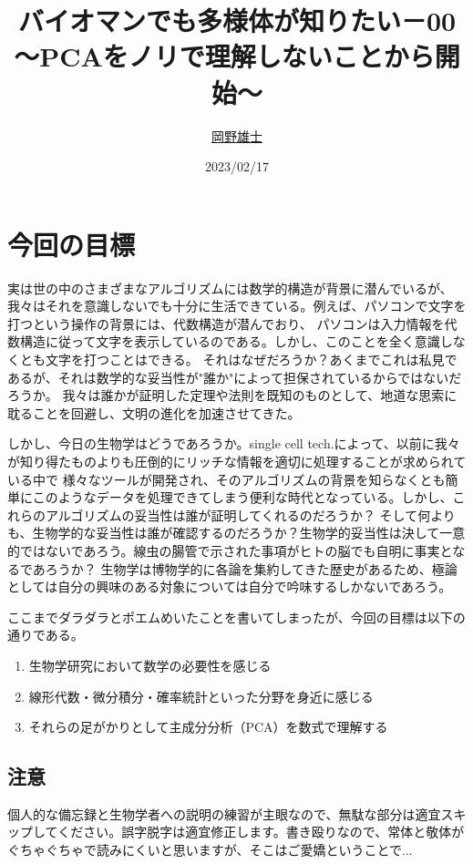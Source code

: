 \documentclass[10pt]{ujarticle}
\title{バイオマンでも多様体が知りたい－00\\〜PCAをノリで理解しないことから開始〜}
\author{\href{mailto:yujiokano@keio.jp}{岡野雄士}}
\date{2023/02/17}
\begin{document}
\maketitle
\section{今回の目標}
実は世の中のさまざまなアルゴリズムには数学的構造が背景に潜んでいるが、我々はそれを意識しないでも十分に生活できている。例えば、パソコンで文字を打つという操作の背景には、代数構造が潜んでおり、
パソコンは入力情報を代数構造に従って文字を表示しているのである。しかし、このことを全く意識しなくとも文字を打つことはできる。
それはなぜだろうか？あくまでこれは私見であるが、それは数学的な妥当性が"誰か"によって担保されているからではないだろうか。
我々は誰かが証明した定理や法則を既知のものとして、地道な思索に耽ることを回避し、文明の進化を加速させてきた。

しかし、今日の生物学はどうであろうか。single cell tech.によって、以前に我々が知り得たものよりも圧倒的にリッチな情報を適切に処理することが求められている中で
様々なツールが開発され、そのアルゴリズムの背景を知らなくとも簡単にこのようなデータを処理できてしまう便利な時代となっている。しかし、これらのアルゴリズムの妥当性は誰が証明してくれるのだろうか？
そして何よりも、生物学的な妥当性は誰が確認するのだろうか？生物学的妥当性は決して一意的ではないであろう。線虫の腸管で示された事項がヒトの脳でも自明に事実となるであろうか？
生物学は博物学的に各論を集約してきた歴史があるため、極論としては自分の興味のある対象については自分で吟味するしかないであろう。

ここまでダラダラとポエムめいたことを書いてしまったが、今回の目標は以下の通りである。

\begin{enumerate}
  \item 生物学研究において数学の必要性を感じる
  \item 線形代数・微分積分・確率統計といった分野を身近に感じる
  \item それらの足がかりとして主成分分析（PCA）を数式で理解する
\end{enumerate}

\subsection{注意}
個人的な備忘録と生物学者への説明の練習が主眼なので、無駄な部分は適宜スキップしてください。誤字脱字は適宜修正します。書き殴りなので、常体と敬体がぐちゃぐちゃで読みにくいと思いますが、そこはご愛嬌ということで...
\end{document}
